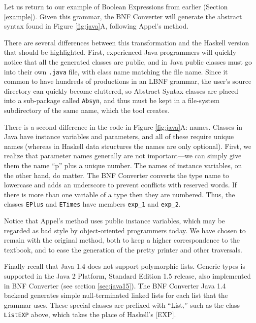 
Let us return to our example of Boolean Expressions from earlier (Section \ref{example}). Given this grammar, the BNF Converter will generate the abstract syntax found in Figure \ref{fig:java}A, following Appel's method.

There are several differences between this transformation and the Haskell version that should be highlighted. First, experienced Java programmers will quickly notice that all the generated classes are public, and in Java public classes must go into their own \texttt{.java} file, with class name matching the file name. Since it common to have hundreds of productions in an LBNF grammar, the user's source directory can quickly become cluttered, so Abstract Syntax classes are placed into a sub-package called {\tt Absyn}, and thus must be kept in a file-system subdirectory of the same name, which the tool creates.

There is a second difference in the code in Figure \ref{fig:java}A: names. Classes in Java have instance variables and parameters, and all of these require unique names (whereas in Haskell data structures the names are only optional). First, we realize that parameter names generally are not important---we can simply give them the name ``p'' plus a unique number. The names of instance variables, on the other hand, do matter. The BNF Converter converts the type name to lowercase and adds an underscore to prevent conflicts with reserved words. If there is more than one variable of a type then they are numbered. Thus, the classes \texttt{EPlus} and \texttt{ETimes} have members \texttt{exp\_1} and \texttt{exp\_2}.

Notice that Appel's method uses public instance variables, which may be regarded as bad style by object-oriented programmers today. We have chosen to remain with the original method, both to keep a higher correspondence to the textbook, 
and to ease the generation of the pretty printer and other traversals.

Finally recall that Java 1.4 does not support polymorphic lists. Generic types is supported in the Java 2 Platform, 
Standard Edition 1.5 release, also implemented in BNF Converter (see section \ref{sec:java15}).
The BNF Converter Java 1.4 backend generates simple null-terminated linked lists for each list that the grammar uses. 
These special classes are prefixed with ``List,'' such as the class \texttt{ListEXP} above, which takes the place 
of Haskell's [EXP].

